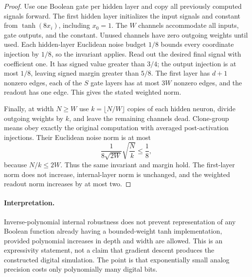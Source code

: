\begin{proof}
Use one Boolean gate per hidden layer and copy all previously computed
signals forward. The first hidden layer initializes the input signals and
constant from $\tanh(8x_i)$, including $x_0=1$.
The $W$ channels accommodate all inputs, gate outputs, and the constant.
Unused channels have zero outgoing weights until used.
Each hidden-layer Euclidean noise budget $1/8$ bounds every coordinate
injection by $1/8$, so the invariant applies. Read out the desired final
signal with coefficient one. It has signed value greater than $3/4$; the
output injection is at most $1/8$, leaving signed margin greater than $5/8$.
The first layer has $d+1$ nonzero edges, each of the $S$ gate layers has at
most $3W$ nonzero edges, and the readout has one edge. This gives the stated
weighted norm.

Finally, at width $N\ge W$ use $k=\lfloor N/W\rfloor$ copies of each hidden
neuron, divide outgoing weights by $k$, and leave the remaining channels dead.
Clone-group means obey exactly the original computation with averaged
post-activation injections. Their Euclidean noise norm is at most
\[
 \frac1{8\sqrt{2W}}\sqrt{\frac Nk}\le\frac18,
\]
because $N/k\le2W$. Thus the same invariant and margin hold.
The first-layer norm does not increase, internal-layer norm is unchanged,
and the weighted readout norm increases by at most two.
\end{proof}

\paragraph{Interpretation.}
Inverse-polynomial internal robustness does not prevent representation of
any Boolean function already having a bounded-weight tanh implementation,
provided polynomial increases in depth and width are allowed. This is an
expressivity statement, not a claim that gradient descent produces the
constructed digital simulation. The point is that exponentially small analog
precision costs only polynomially many digital bits.
